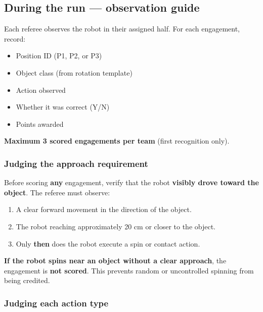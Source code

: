 \documentclass[a4]{article}
\begin{document}
\subsection*{During the run --- observation guide}

Each referee observes the robot in their assigned half. For each engagement, record:
\begin{itemize}[nosep]
    \item Position ID (P1, P2, or P3)
    \item Object class (from rotation template)
    \item Action observed
    \item Whether it was correct (Y/N)
    \item Points awarded
\end{itemize}

\textbf{Maximum 3 scored engagements per team} (first recognition only).

\subsubsection*{Judging the approach requirement}

Before scoring \textbf{any} engagement, verify that the robot \textbf{visibly drove toward the object}. The referee must observe:
\begin{enumerate}
    \item A clear forward movement in the direction of the object.
    \item The robot reaching approximately 20 cm or closer to the object.
    \item Only \textbf{then} does the robot execute a spin or contact action.
\end{enumerate}

\textbf{If the robot spins near an object without a clear approach}, the engagement is \textbf{not scored}. This prevents random or uncontrolled spinning from being credited.

\subsubsection*{Judging each action type}
\end{document}
